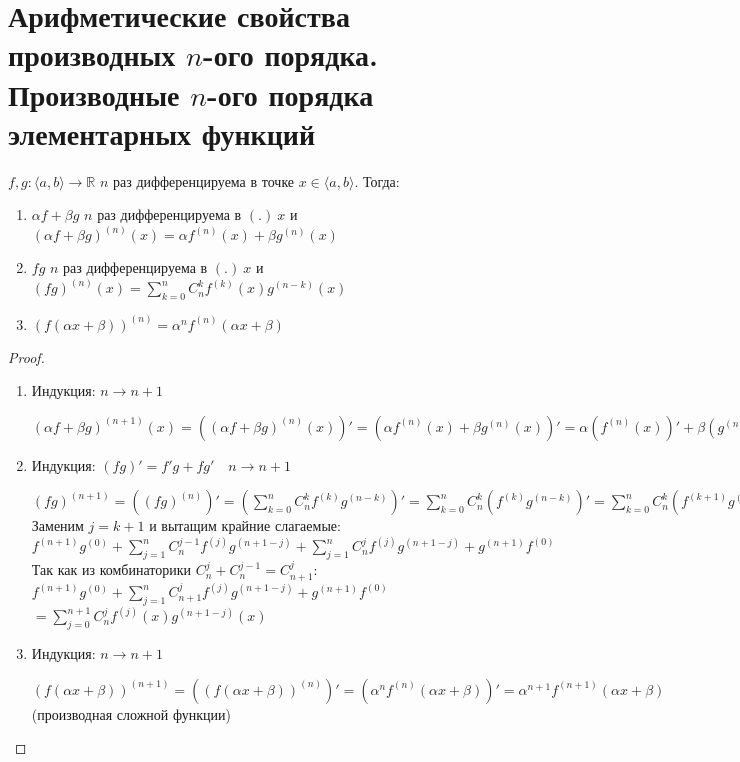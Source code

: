 \section{Арифметические свойства производных $n$-ого порядка. Производные $n$-ого порядка элементарных функций}

\begin{theorem-non}
    $f, g: \langle a,b \rangle \rightarrow \mathbb{R}$ $n$ раз дифференцируема в точке $x \in \langle a,b \rangle$. Тогда:

    \begin{enumerate}
        \item $\alpha f + \beta g$ $n$ раз дифференцируема в $(.) \ x$ и $(\alpha f + \beta g)^{(n)} (x) = \alpha f^{(n)}(x) + \beta g^{(n)}(x)$ 
        \item $fg$ $n$ раз дифференцируема в $(.) \ x$ и $(fg)^{(n)}(x) = \sum\limits_{k=0}^{n} C_n^k f^{(k)}(x) g^{(n-k)} (x)$
        \item $(f(\alpha x + \beta))^{(n)} = \alpha^n f^{(n)}(\alpha x + \beta)$
    \end{enumerate}
\end{theorem-non}
\begin{proof}
    \
    \begin{enumerate}
        \item Индукция: $n \longrightarrow n+1$
        
        $(\alpha f + \beta g)^{(n+1)}(x) = ((\alpha f + \beta g)^{(n)} (x))' = 
        (\alpha f^{(n)}(x) + \beta g^{(n)}(x))' = \alpha (f^{(n)}(x))' + \beta (g^{(n)}(x))' = 
        \alpha f^{(n+1)}(x) + \beta g^{(n+1)}(x)$

        \item Индукция: $(fg)' = f'g + fg' \quad n \longrightarrow n+1$
        
        $(fg)^{(n+1)} = ((fg)^{(n)})' = (\sum\limits_{k=0}^{n} C_n^k f^{(k)} g^{(n-k)})' = 
        \sum\limits_{k=0}^{n} C_n^k (f^{(k)} g^{(n-k)})' = \sum\limits_{k=0}^{n} C_n^k (f^{(k + 1)} g^{(n-k)} + f^{(k)} g^{(n-k+1)}) =
        \sum\limits_{k=0}^{n} C_n^k f^{(k+1)} g^{(n-k)} + \sum\limits_{j=0}^{n} C_n^j f^{(j)} g^{(n-j+1)}$\\
        Заменим $j= k+1$ и вытащим крайние слагаемые: $f^{(n+1)}g^{(0)} + \sum\limits_{j=1}^{n} C_n^{j-1} f^{(j)} g^{(n+1-j)} + \sum\limits_{j=1}^{n} C_n^j f^{(j)} g^{(n+1-j)} + g^{(n+1)}f^{(0)}$\\
        Так как из комбинаторики $C_n^j + C_n^{j-1} = C_{n+1}^j$: $f^{(n+1)}g^{(0)} + \sum\limits_{j=1}^{n} C_{n+1}^j f^{(j)} g^{(n+1-j)} + g^{(n+1)}f^{(0)}$\\
        $= \sum\limits_{j=0}^{n+1} C_n^j f^{(j)}(x) g^{(n+1-j)} (x)$

        \item Индукция: $n \longrightarrow n+1$
        
        $(f(\alpha x + \beta))^{(n+1)} = ((f(\alpha x + \beta))^{(n)})' = (\alpha^n f^{(n)}(\alpha x + \beta))' = 
        \alpha^{n+1} f^{(n+1)}(\alpha x + \beta)$ (производная сложной функции)

    \end{enumerate}
\end{proof}

